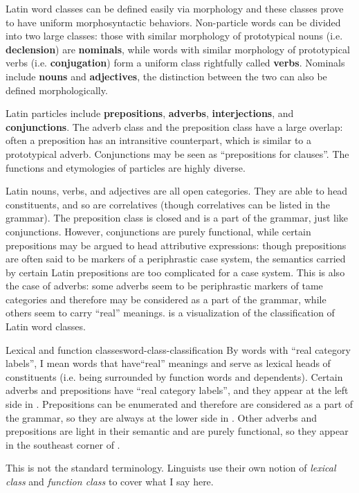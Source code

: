\documentclass[a4paper, oneside]{report}
\newcommand*{\concept}[1]{\textbf{#1}}
\newcommand*{\term}[1]{\emph{#1}}
\begin{document}
Latin word classes can be defined easily via morphology
and these classes prove to have uniform morphosyntactic behaviors.
Non-particle words can be divided into two large classes:
those with similar morphology of prototypical nouns (i.e. \concept{declension}) are \concept{nominals},
while words with similar morphology of prototypical verbs (i.e. \concept{conjugation})
form a uniform class rightfully called \concept{verbs}.
Nominals include \concept{nouns} and \concept{adjectives},
the distinction between the two can also be defined morphologically.

Latin particles include \concept{prepositions}, \concept{adverbs},
\concept{interjections}, and \concept{conjunctions}.
The adverb class and the preposition class have a large overlap:
often a preposition has an intransitive counterpart,
which is similar to a prototypical adverb.
Conjunctions may be seen as ``prepositions for clauses''.
The functions and etymologies of particles are highly diverse.

Latin nouns, verbs, and adjectives are all open categories.
They are able to head constituents,
and so are correlatives (though correlatives can be listed in the grammar).
The preposition class is closed and is a part of the grammar,
just like conjunctions.
However, conjunctions are purely functional,
while certain prepositions may be argued to head attributive expressions:
though prepositions are often said to be markers of a periphrastic case system,
the semantics carried by certain Latin prepositions are too complicated for a case system.
This is also the case of adverbs:
some adverbs seem to be periphrastic markers of \acs{tame} categories
and therefore may be considered as a part of the grammar,
while others seem to carry ``real'' meanings.
 is a visualization of the classification of Latin word classes.

\begin{theorybox}{Lexical and function classes}{word-class-classification}
    By words with ``real category labels'',
    I mean words that have``real'' meanings
    and serve as lexical heads of constituents
    (i.e. being surrounded by function words and dependents).
    Certain adverbs and prepositions have ``real category labels'',
    and they appear at the left side in .
    Prepositions can be enumerated and therefore are considered as a part of the grammar,
    so they are always at the lower side in .
    Other adverbs and prepositions are light in their semantic
    and are purely functional,
    so they appear in the southeast corner of .

    This is not the standard terminology. 
    Linguists use their own notion of \term{lexical class} and \term{function class}
    to cover what I say here. 
\end{theorybox}
\end{document}
